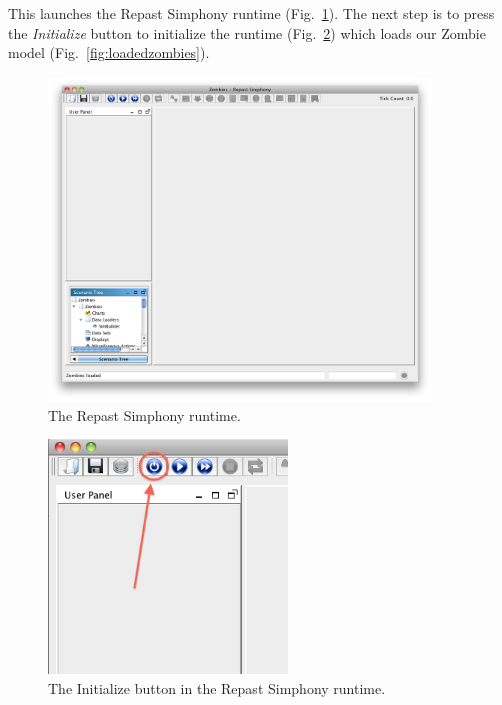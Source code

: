 \documentclass[11pt]{amsart}
\begin{document}
This launches the Repast Simphony runtime (Fig.~\ref{fig:repastruntime}). The next step is to press the \emph{Initialize} button to initialize the runtime (Fig.~\ref{fig:initruntime}) which loads our Zombie model (Fig.~\ref{fig:loadedzombies}).
\begin{figure}
\begin{center}
\vspace{.2in}
\centerline {
\includegraphics[width=4in]{GettingStartedImages/RepastRuntime.png}
}
\caption{The Repast Simphony runtime.}
\label{fig:repastruntime}
\end{center}
\end{figure}
\begin{figure}
\begin{center}
\vspace{.2in}
\centerline {
\includegraphics[width=2.5in]{GettingStartedImages/InitializeRuntime.png}
}
\caption{The Initialize button in the Repast Simphony runtime.}
\label{fig:initruntime}
\end{center}
\end{figure}
\end{document}
